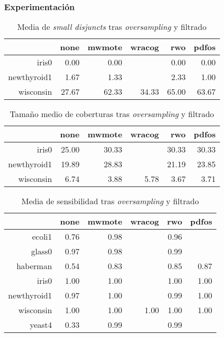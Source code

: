 \begin{frame}\frametitle{Experimentación}
  \begin{table}[H]
  \centering
  \begin{tabular}{rrrrrr}
  \hline
  & none & mwmote & wracog & rwo & pdfos \\ 
  \hline
  iris0 & 0.00 & 0.00 &  & 0.00 & 0.00 \\ 
  newthyroid1 & 1.67 & 1.33 &  & 2.33 & 1.00 \\ 
  wisconsin & 27.67 & 62.33 & 34.33 & 65.00 & 63.67 \\ 
  \hline
  \end{tabular}
  \caption{Media de \textit{small disjuncts} tras \textit{oversampling} y filtrado}
  \end{table}

  \vspace{-2em}
  
  \begin{table}[H]
  \centering
  \begin{tabular}{rrrrrr}
   \hline
   & none & mwmote & wracog & rwo & pdfos \\ 
   \hline
   iris0 & 25.00 & 30.33 &  & 30.33 & 30.33 \\ 
   newthyroid1 & 19.89 & 28.83 &  & 21.19 & 23.85 \\ 
   wisconsin & 6.74 & 3.88 & 5.78 & 3.67 & 3.71 \\
   \hline
  \end{tabular}
  \caption{Tamaño medio de coberturas tras \textit{oversampling} y filtrado}
  \end{table}
  
  \vspace{-2em}
  
  \begin{table}[H]
  \centering
  \begin{tabular}{rrrrrr}
  \hline
  & none & mwmote & wracog & rwo & pdfos \\ 
  \hline
  ecoli1 & 0.76 & 0.98 &  & 0.96 &  \\ 
  glass0 & 0.97 & 0.98 &  & 0.99 &  \\ 
  haberman & 0.54 & 0.83 &  & 0.85 & 0.87 \\ 
  iris0 & 1.00 & 1.00 &  & 1.00 & 1.00 \\ 
  newthyroid1 & 0.97 & 1.00 &  & 0.99 & 1.00 \\ 
  wisconsin & 1.00 & 1.00 & 1.00 & 1.00 & 1.00 \\ 
  yeast4 & 0.33 & 0.99 &  & 0.99 &  \\ 
  \hline
  \end{tabular}
  \caption{Media de sensibilidad tras \textit{oversampling} y filtrado}
  \end{table}
  
\end{frame}
